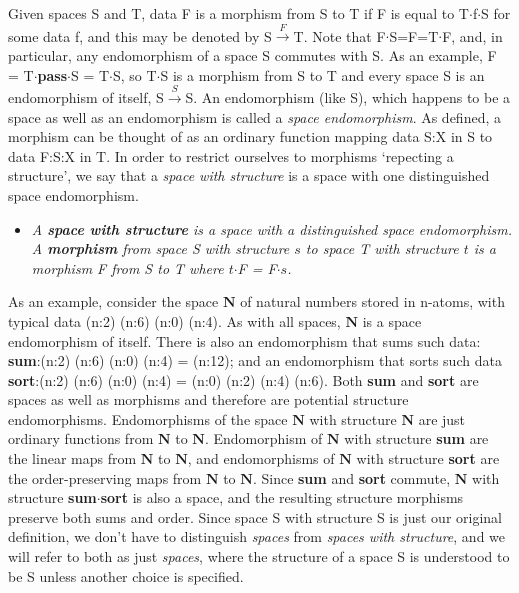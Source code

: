 \documentclass[11pt]{article}
\begin{document}
Given spaces S and T, data F is a morphism from S to T if F is equal to T$\cdot$f$\cdot$S for some data f, and this may be denoted by S${\overset F\rightarrow}$T.   Note that F$\cdot$S=F=T$\cdot$F, and, in particular, any endomorphism of a space S commutes with S.  
As an example, F = T$\cdot${\bf pass}$\cdot$S = T$\cdot$S, so T$\cdot$S is a morphism from S to T and every space S is an endomorphism of itself, S${\overset S\rightarrow}$S.  An endomorphism (like S), which happens to be a space as well as an endomorphism is called a {\it space endomorphism}.  As defined, a morphism can be thought of as an ordinary function mapping data S:X in S to data F:S:X in T.  In order to 
restrict ourselves to morphisms `repecting a structure', we say that a {\it space with structure} is a space with one distinguished space endomorphism.  
\begin{itemize}
\item[]{\it A {\bf space with structure} is a space with a distinguished space endomorphism.  A {\bf morphism} from space S with structure $s$ to space T with structure $t$ is a morphism F from S to T where $t$$\cdot$F = F$\cdot$$s$.}
\end{itemize}
\noindent As an example, consider the space $\mathbf N$ of natural numbers stored in n-atoms, with typical data (n:2) (n:6) (n:0) (n:4).  As with all spaces, $\mathbf N$ is a space endomorphism of itself.  There is also an endomorphism that sums such data: {\bf sum}:(n:2) (n:6) (n:0) (n:4) = (n:12); and an endomorphism that sorts such data {\bf sort}:(n:2) (n:6) (n:0) (n:4) = (n:0) (n:2) (n:4) (n:6).  Both {\bf sum} and {\bf sort} are spaces as well as morphisms and therefore are potential structure endomorphisms.  Endomorphisms of the space $\mathbf N$ with structure $\mathbf N$ are just ordinary functions from $\mathbf N$ to $\mathbf N$.  Endomorphism of $\mathbf N$ with structure {\bf sum} are the linear maps from $\mathbf N$ to $\mathbf N$, and endomorphisms of $\mathbf N$ with structure {\bf sort} are the order-preserving maps from $\mathbf N$ to $\mathbf N$.  Since {\bf sum} and {\bf sort} commute, 
$\mathbf N$  with structure {\bf sum}$\cdot${\bf sort} is also a space, and the resulting structure morphisms preserve both sums and order. 
Since space S with structure S is just our original definition, we don't have to distinguish {\it spaces} from {\it spaces with structure}, and we will refer to both as just {\it spaces}, where the structure of a space S is understood to be S unless another choice is specified. 
\end{document}
